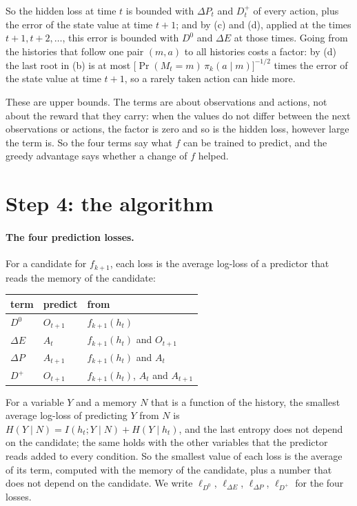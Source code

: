 \documentclass[11pt]{article}
\theoremstyle{definition}
\newcommand{\dE}{\Delta E}
\newcommand{\dP}{\Delta P}
\begin{document}
So the hidden loss at time $t$ is bounded with $\dP_t$ and $D^+_t$ of every action, plus the error of the state value at time $t+1$; and by (c) and (d), applied at the times $t+1,t+2,\dots$, this error is bounded with $D^0$ and $\dE$ at those times. Going from the histories that follow one pair $(m,a)$ to all histories costs a factor: by (d) the last root in (b) is at most $\big[\Pr(M_t=m)\,\pi_k(a\mid m)\big]^{-1/2}$ times the error of the state value at time $t+1$, so a rarely taken action can hide more.

These are upper bounds. The terms are about observations and actions, not about the reward that they carry: when the values do not differ between the next observations or actions, the factor is zero and so is the hidden loss, however large the term is. So the four terms say what $f$ can be trained to predict, and the greedy advantage says whether a change of $f$ helped.

\section{Step 4: the algorithm}\label{sec:algo}

\paragraph{The four prediction losses.} For a candidate for $f_{k+1}$, each loss is the average log-loss of a predictor that reads the memory of the candidate:
\begin{center}
\small
\begin{tabular}{lll}
\hline
term & predict & from\\
\hline
$D^0$ & $O_{t+1}$ & $f_{k+1}(h_t)$\\
$\dE$ & $A_t$ & $f_{k+1}(h_t)$ and $O_{t+1}$\\
$\dP$ & $A_{t+1}$ & $f_{k+1}(h_t)$ and $A_t$\\
$D^+$ & $O_{t+1}$ & $f_{k+1}(h_t)$, $A_t$ and $A_{t+1}$\\
\hline
\end{tabular}
\end{center}
For a variable $Y$ and a memory $N$ that is a function of the history, the smallest average log-loss of predicting $Y$ from $N$ is $H(Y\mid N)=I(h_t;Y\mid N)+H(Y\mid h_t)$, and the last entropy does not depend on the candidate; the same holds with the other variables that the predictor reads added to every condition. So the smallest value of each loss is the average of its term, computed with the memory of the candidate, plus a number that does not depend on the candidate. We write $\ell_{D^0}$, $\ell_{\dE}$, $\ell_{\dP}$, $\ell_{D^+}$ for the four losses.
\end{document}
